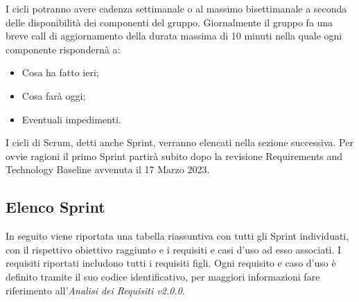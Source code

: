 I cicli potranno avere cadenza settimanale o al massimo bisettimanale a seconda delle disponibilità dei componenti del gruppo.
Giornalmente il gruppo fa una breve call di aggiornamento della durata massima di 10 minuti nella quale ogni componente rispondernà a:
\begin{itemize}
    \item Cosa ha fatto ieri;
    \item Cosa farà oggi;
    \item Eventuali impedimenti.
\end{itemize}
I cicli di Scrum, detti anche Sprint, verranno elencati nella sezione successiva.
Per ovvie ragioni il primo Sprint partirà subito dopo la revisione Requirements and Technology Baseline avvenuta il 17 Marzo 2023.

\subsection{Elenco Sprint}
In seguito viene riportata una tabella riassuntiva con tutti gli Sprint individuati, con il rispettivo obiettivo raggiunto e i requisiti e casi d’uso ad esso associati. I requisiti riportati includono tutti i requisiti figli.
Ogni requisito e caso d’uso è definito tramite il suo codice identificativo, per maggiori informazioni fare riferimento all’\textit{Analisi dei Requisiti v2.0.0}.

\renewcommand{\arraystretch}{1.8}


